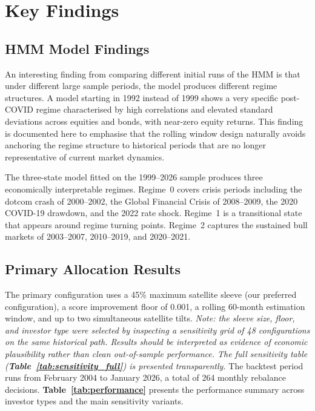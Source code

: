 \documentclass[12pt, a4paper]{article}
\begin{document}
\clearpage
\clearpage
\section{Key Findings}
\label{sec:findings}

\subsection{HMM Model Findings}

An interesting finding from comparing different initial runs of the HMM is that under
different large sample periods, the model produces different regime structures. A model
starting in 1992 instead of 1999 shows a very specific post-COVID regime characterised
by high correlations and elevated standard deviations across equities and bonds, with
near-zero equity returns. This finding is documented here to emphasise that the rolling
window design naturally avoids anchoring the regime structure to historical periods that
are no longer representative of current market dynamics.

The three-state model fitted on the 1999--2026 sample produces three economically
interpretable regimes. Regime~0 covers crisis periods including the dotcom crash of
2000--2002, the Global Financial Crisis of 2008--2009, the 2020 COVID-19 drawdown, and the
2022 rate shock. Regime~1 is a transitional state that appears around regime turning points.
Regime~2 captures the sustained bull markets of 2003--2007, 2010--2019, and 2020--2021.

\subsection{Primary Allocation Results}

The primary configuration uses a 45\% maximum satellite sleeve (our preferred configuration), a score improvement floor
of 0.001, a rolling 60-month estimation window, and up to two simultaneous satellite tilts.
\textit{Note: the sleeve size, floor, and investor type were selected by inspecting a
sensitivity grid of 48 configurations on the same historical path. Results should be
interpreted as evidence of economic plausibility rather than clean out-of-sample performance.
The full sensitivity table (\textbf{Table~\ref{tab:sensitivity_full}}) is presented
transparently.}
The backtest period runs from February 2004 to January 2026, a total of 264 monthly
rebalance decisions. \textbf{Table~\ref{tab:performance}} presents the performance summary across investor
types and the main sensitivity variants.
\end{document}

